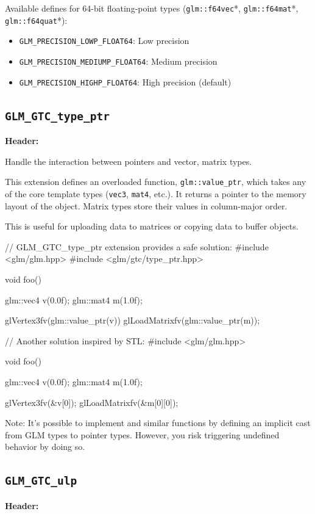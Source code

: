 \documentclass{scrartcl}
\numberwithin{figure}{subsection}
\begin{document}
Available defines for 64-bit floating-point types (\verb|glm::f64vec|*, \verb|glm::f64mat|*, \verb|glm::f64quat|*):

\begin{itemize}
    \item \verb|GLM_PRECISION_LOWP_FLOAT64|: Low precision
    \item \verb|GLM_PRECISION_MEDIUMP_FLOAT64|: Medium precision
    \item \verb|GLM_PRECISION_HIGHP_FLOAT64|: High precision (default)
\end{itemize}

\subsection{\texttt{GLM\_GTC\_type\_ptr}}
\textbf{Header:} 

Handle the interaction between pointers and vector, matrix types.

This extension defines an overloaded function, \verb|glm::value_ptr|, which takes any of the core template types (\verb|vec3|, \verb|mat4|, etc.). It returns a pointer to the memory layout of the object. Matrix types store their values in column-major order.

This is useful for uploading data to matrices or copying data to buffer objects.

\begin{cppcode}
// GLM_GTC_type_ptr extension provides a safe solution:
#include <glm/glm.hpp>
#include <glm/gtc/type_ptr.hpp>

void foo()
{
  glm::vec4 v(0.0f);
  glm::mat4 m(1.0f);

  glVertex3fv(glm::value_ptr(v)) 
  glLoadMatrixfv(glm::value_ptr(m));
}
\end{cppcode}

\begin{cppcode}
// Another solution inspired by STL:
#include <glm/glm.hpp>

void foo()
{
  glm::vec4 v(0.0f);
  glm::mat4 m(1.0f);

  glVertex3fv(&v[0]);
  glLoadMatrixfv(&m[0][0]);
}
\end{cppcode}

Note: It's possible to implement  and similar functions by defining an implicit cast from GLM types to pointer types.  However, you risk triggering undefined behavior by doing so.

\subsection{\texttt{GLM\_GTC\_ulp}}
\textbf{Header:} 
\end{document}
